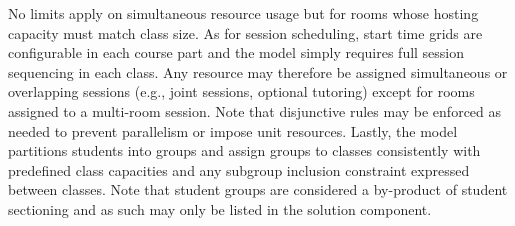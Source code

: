 No limits apply on simultaneous resource usage but for rooms whose hosting capacity must match %
class size. 
As for session scheduling, start time grids are configurable in each course part and 
the model simply requires full session sequencing in each class. 
Any resource may therefore be assigned simultaneous or overlapping sessions  (e.g., joint sessions, optional tutoring) except for rooms assigned to a multi-room session. 
Note that disjunctive rules may be enforced as needed to prevent parallelism or impose unit resources. 
%
Lastly, the model partitions students into groups and assign groups to classes consistently with predefined class capacities and any subgroup inclusion constraint expressed between classes.
Note that student groups are considered a by-product of student sectioning and as such may only be listed in the solution component. 

